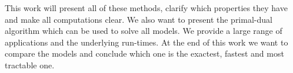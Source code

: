     This work will present all of these methods, clarify which properties they have and make all computations clear. We also want to present the primal-dual algorithm which can be used to solve all models. We provide a large range of applications and the underlying run-times. At the end of this work we want to compare the models and conclude which one is the exactest, fastest and most tractable one.



    
